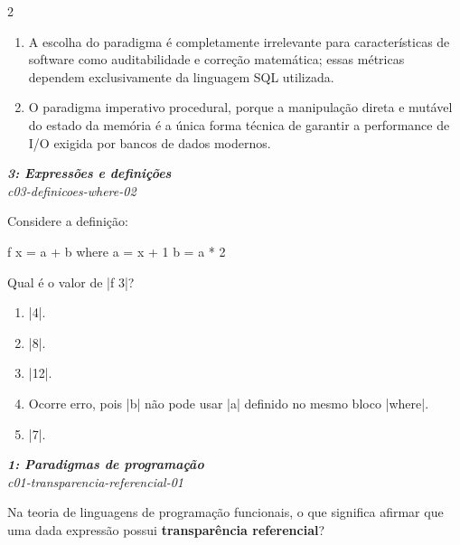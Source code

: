 \documentclass[a4paper,10pt,brazil]{article}
\begin{document}
\begin{multicols}{2}
\begin{enumerate}
  \item A escolha do paradigma é completamente irrelevante para características de software como auditabilidade e correção matemática; essas métricas dependem exclusivamente da linguagem SQL utilizada.

  \item O paradigma imperativo procedural, porque a manipulação direta e mutável do estado da memória é a única forma técnica de garantir a performance de I/O exigida por bancos de dados modernos.


\end{enumerate}

\begin{flushright}
  \footnotesize
  \textit{\textbf{3: Expressões e definições}}\\
  \textit{c03-definicoes-where-02}\\

\end{flushright}
Considere a definição:

\begin{haskellcode}
f x = a + b
  where
    a = x + 1
    b = a * 2
\end{haskellcode}

Qual é o valor de \haskellinline|f 3|?

\begin{enumerate}
  \item \haskellinline|4|.

  \item \haskellinline|8|.

  \item \haskellinline|12|.

  \item Ocorre erro, pois \haskellinline|b| não pode usar \haskellinline|a| definido no mesmo bloco \haskellinline|where|.

  \item \haskellinline|7|.


\end{enumerate}

\begin{flushright}
  \footnotesize
  \textit{\textbf{1: Paradigmas de programação}}\\
  \textit{c01-transparencia-referencial-01}\\

\end{flushright}
Na teoria de linguagens de programação funcionais, o que significa afirmar que uma dada expressão possui \textbf{transparência referencial}?


\end{multicols}
\end{document}
